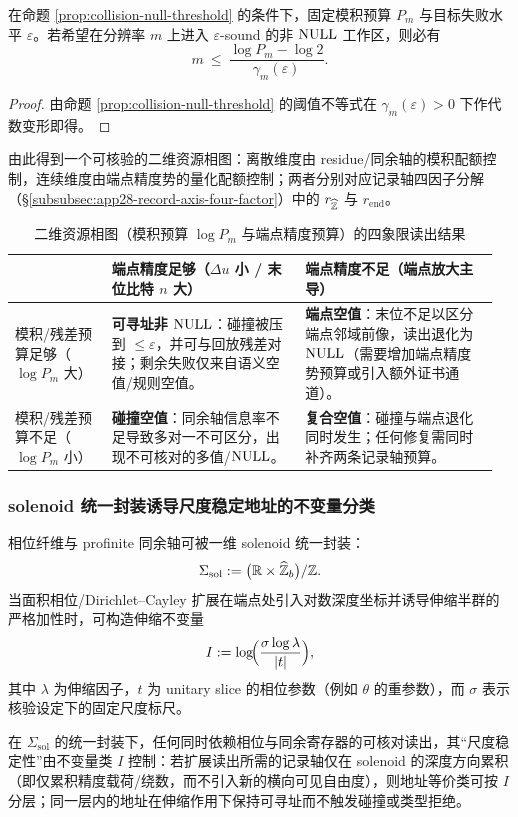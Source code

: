 \begin{corollary}[固定预算下的最大有效扫描深度]\label{cor:max-effective-scan-depth}
在命题 \ref{prop:collision-null-threshold} 的条件下，固定模积预算 $P_m$ 与目标失败水平 $\varepsilon$。若希望在分辨率 $m$ 上进入 $\varepsilon$-sound 的非 $\mathrm{NULL}$ 工作区，则必有
$$
m\ \le\ \frac{\log P_m-\log 2}{\gamma_m(\varepsilon)}.
$$
\end{corollary}

\begin{proof}
由命题 \ref{prop:collision-null-threshold} 的阈值不等式在 $\gamma_m(\varepsilon)>0$ 下作代数变形即得。
\end{proof}
由此得到一个可核验的二维资源相图：离散维度由 residue/同余轴的模积配额控制，连续维度由端点精度势的量化配额控制；两者分别对应记录轴四因子分解（\S\ref{subsubsec:app28-record-axis-four-factor}）中的 $r_{\widehat{\mathbb{Z}}}$ 与 $r_{\mathrm{end}}$。

\begin{table}[H]
\centering
\caption{二维资源相图（模积预算 \texorpdfstring{$\log P_m$}{log Pm} 与端点精度预算）的四象限读出结果}
\label{tab:resource-phase-diagram}
\begin{tabular}{@{}>{\raggedright\arraybackslash}p{0.19\linewidth} >{\raggedright\arraybackslash}p{0.385\linewidth} >{\raggedright\arraybackslash}p{0.385\linewidth}@{}}
\toprule
 & 端点精度足够（\(\Delta u\) 小 / 末位比特 \(n\) 大） & 端点精度不足（端点放大主导） \\
\midrule
模积/残差预算足够（\(\log P_m\) 大） &
\textbf{可寻址非 \(\mathrm{NULL}\)}：碰撞被压到 \(\le\varepsilon\)，并可与回放残差对接；剩余失败仅来自语义空值/规则空值。 &
\textbf{端点空值}：末位不足以区分端点邻域前像，读出退化为 \(\mathrm{NULL}\)（需要增加端点精度势预算或引入额外证书通道）。 \\
\midrule
模积/残差预算不足（\(\log P_m\) 小） &
\textbf{碰撞空值}：同余轴信息率不足导致多对一不可区分，出现不可核对的多值/\(\mathrm{NULL}\)。 &
\textbf{复合空值}：碰撞与端点退化同时发生；任何修复需同时补齐两条记录轴预算。 \\
\bottomrule
\end{tabular}
\end{table}

\subsubsection{solenoid 统一封装诱导尺度稳定地址的不变量分类}\label{subsubsec:app28-solenoid-invariants}
相位纤维与 profinite 同余轴可被一维 solenoid 统一封装：
$$
\Sigma_{\mathrm{sol}}:=\bigl(\mathbb{R}\times \widehat{\mathbb{Z}}_b\bigr)/\mathbb{Z}.
$$
当面积相位/Dirichlet--Cayley 扩展在端点处引入对数深度坐标并诱导伸缩半群的严格加性时，可构造伸缩不变量
$$
I:=\log\!\Bigl(\frac{\sigma\log\lambda}{|t|}\Bigr),
$$
其中 $\lambda$ 为伸缩因子，$t$ 为 unitary slice 的相位参数（例如 $\theta$ 的重参数），而 $\sigma$ 表示核验设定下的固定尺度标尺。
\par
在 $\Sigma_{\mathrm{sol}}$ 的统一封装下，任何同时依赖相位与同余寄存器的可核对读出，其“尺度稳定性”由不变量类 $I$ 控制：若扩展读出所需的记录轴仅在 solenoid 的深度方向累积（即仅累积精度载荷/绕数，而不引入新的横向可见自由度），则地址等价类可按 $I$ 分层；同一层内的地址在伸缩作用下保持可寻址而不触发碰撞或类型拒绝。

